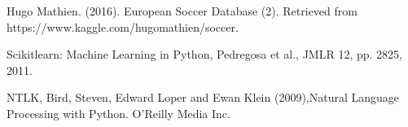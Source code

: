 \documentclass[10pt,journal,compsoc]{IEEEtran}
\begin{document}
\ifCLASSOPTIONcaptionsoff
  \newpage
\fi





%
%
%
\begin{thebibliography}{1}

Hugo Mathien. (2016). European Soccer Database (2). Retrieved from https://www.kaggle.com/hugomathien/soccer.

Scikit\-learn: Machine Learning in Python, Pedregosa et al., JMLR 12, pp. 2825, 2011.

NTLK, Bird, Steven, Edward Loper and Ewan Klein (2009),Natural Language Processing with Python. O’Reilly Media Inc.
\end{thebibliography}

% 








\end{document}

